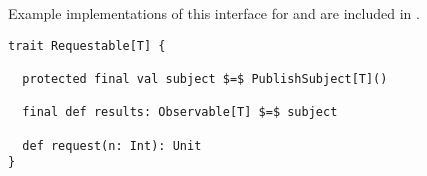 Example implementations of this interface for \itr and  are included in .

\begin{minipage}{\linewidth}
\begin{lstlisting}[style=ScalaStyle, caption={Universal, interactive interface used in the feedback system}, label={lst:universal-interactive-interface}]
trait Requestable[T] {

  protected final val subject $=$ PublishSubject[T]()

  final def results: Observable[T] $=$ subject

  def request(n: Int): Unit
}
\end{lstlisting}
\end{minipage}

